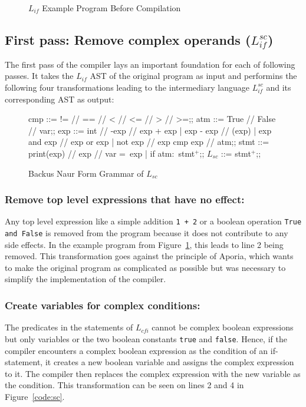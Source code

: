 \begin{figure}[h]
	\centering
	
	\caption{$L_{if}$ Example Program Before Compilation}
	\label{code:lif}
\end{figure}

\subsection{First pass: Remove complex operands ($L_{if}^{sc}$)}


The first pass of the compiler lays an important foundation for each of following passes. It takes the $L_{if}$ AST of the original program as input and performins the following four transformations leading to the intermediary language $L_{if}^{sc}$ and its corresponding AST as output:

\begin{figure}[h!]
	\centering
	\begin{bnf}[row{-} = {bg = gray9}]
		cmp ::= != // == // < // <= // > // >=;;
		atm ::= True // False // var;;
		exp ::= int  // -exp // exp + exp 
		| exp - exp // (exp)
		| exp and exp // exp or exp 
		| not exp // exp cmp exp // atm;;
		stmt ::= print(exp) // exp // var = exp
		| if atm$\colon$ stmt$^+$;;
		$L_{sc}$ ::= stmt$^+$;;
	\end{bnf}
	\caption{Backus Naur Form Grammar of $L_{sc}$}
	\label{bnf:sc}
\end{figure}

\subsubsection{Remove top level expressions that have no effect:}
Any top level expression like a simple addition \texttt{1 + 2} or a boolean operation \texttt{True and False} is removed from the program because it does not contribute to any side effects. In the example program from Figure~\ref{code:lif}, this leads to line 2 being removed.
This transformation goes against the principle of Aporia, which wants to make the original program as complicated as possible but was necessary to simplify the implementation of the compiler.

\subsubsection{Create variables for complex conditions:}
The predicates in the statements of $L_{cfi}$ cannot be complex boolean expressions but only variables or the two boolean constants \texttt{true} and \texttt{false}.
Hence, if the compiler encounters a complex boolean expression as the condition of an if-statement, it creates a new boolean variable and assigns the complex expression to it. 
The compiler then replaces the complex expression with the new variable as the condition.
This transformation can be seen on lines 2 and 4 in Figure~\ref{code:sc}.

